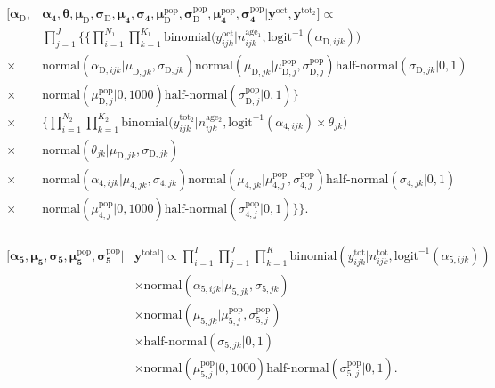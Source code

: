 \documentclass[12pt, oneside, titlepage]{article}   	%
\begin{document}
\begin{align}
  \begin{split}
  [  \bm{\alpha_\mathrm{D}} , &  \bm{\alpha_4}, \bm{\theta}, \bm{\mu_\mathrm{D}} , \bm{\sigma_\mathrm{D}} , \bm{\mu_4} , \bm{\sigma_4} , \bm{\mu^\mathrm{pop}_\mathrm{D}}, \bm{\sigma^\mathrm{pop}_\mathrm{D}} , \bm{\mu^\mathrm{pop}_4}, \bm{\sigma^\mathrm{pop}_4} | \bm{y^\mathrm{oct}} , \bm{y^\mathrm{tot_2}}  ]  \propto  \\  
 	     & \prod_{j=1}^{J} \bigg\{ \Big\{ \prod_{i=1}^{N_1}  \prod_{k=1}^{K_1} \mathrm{binomial} \big( y^{\mathrm{oct}}_{ijk} | n^\mathrm{age_1}_{ijk}, \mathrm{logit}^{-1}( \alpha_{\mathrm{D},ijk} ) \big) \\
	      \times & \mathrm{normal} ( \alpha_{\mathrm{D},ijk}  | \mu_{\mathrm{D},jk}, \sigma{_{\mathrm{D},jk} }) \mathrm{normal} ( \mu_{\mathrm{D},jk}  | \mu^\mathrm{pop}_{\mathrm{D},j}, \sigma^\mathrm{pop}_{\mathrm{D},j} ) 
 \textrm{half-normal} ( \sigma_{\mathrm{D},jk} | 0,1) \\
 \times & \mathrm{normal} ( \mu^\mathrm{pop}_{\mathrm{D},j} | 0 , 1000 ) \textrm{half-normal} ( \sigma^\mathrm{pop}_{\mathrm{D},j} | 0,1)   \Big\}  \\
  \times &  \Big\{ \prod_{i=1}^{N_2}  \prod_{k=1}^{K_2}   \mathrm{binomial} \big( y^{\mathrm{tot_2}}_{ijk} | n^\mathrm{age_2}_{ijk}, \mathrm{logit}^{-1}( \alpha_{\mathrm{4},ijk} ) \times \theta_{jk} \big) \\
   \times & \mathrm{normal} ( \theta_{jk}  | \mu_{\mathrm{D},jk}, \sigma{_{\mathrm{D},jk} }) \\
    \times & \mathrm{normal} ( \alpha_{\mathrm{4},ijk}  | \mu_{\mathrm{4},jk}, \sigma{_{\mathrm{4},jk} }) \mathrm{normal} ( \mu_{\mathrm{4},jk}  | \mu^\mathrm{pop}_{\mathrm{4},j}, \sigma^\mathrm{pop}_{\mathrm{4},j} ) \textrm{half-normal} ( \sigma_{\mathrm{4},jk} | 0,1) \\
    \times & \mathrm{normal} ( \mu^\mathrm{pop}_{\mathrm{4},j} | 0 , 1000 ) \textrm{half-normal} ( \sigma^\mathrm{pop}_{\mathrm{4},j} | 0,1) \Big\}  \bigg\}.
  \end{split}
\end{align}


%
\begin{align}
  \begin{split}
 [  \bm{\alpha_5} , \bm{\mu_5} , \bm{\sigma_5} , \bm{\mu^\mathrm{pop}_5}, \bm{\sigma^\mathrm{pop}_5} | & \bm{y^{\mathrm{total}}}  ] \propto \prod_{i=1}^{I}   \prod_{j=1}^{J}  \prod_{k=1}^{K} 
   \mathrm{binomial} ( y^{\mathrm{tot}}_{ijk} | n^\mathrm{tot}_{ijk}, \mathrm{logit}^{-1}( \alpha_{5,ijk} ) ) 
   \\ & \times \mathrm{normal} ( \alpha_{5,ijk}  | \mu_{5,jk}, \sigma{_{5,jk} })
  \\ & \times \mathrm{normal} ( \mu_{5,jk}  | \mu^\mathrm{pop}_{5,j}, \sigma^\mathrm{pop}_{5,j} )
  \\ & \times \textrm{half-normal} ( \sigma_{5,jk} | 0,1)
  \\ & \times \mathrm{normal} ( \mu^\mathrm{pop}_{5,j} | 0 , 1000 ) \textrm{half-normal} ( \sigma^\mathrm{pop}_{5,j} | 0,1).
  \end{split}
\end{align}
\end{document}
